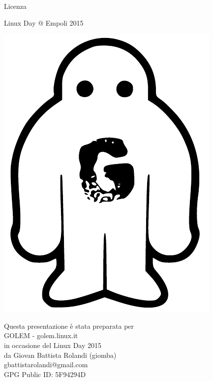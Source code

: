 \documentclass{beamer}
\begin{document}
\begin{frame}
\begin{block}{Licenza}
  \end{block}

  \begin{block}{Linux Day @ Empoli 2015}
    \centering
    \begin{minipage}{.1\linewidth}
      \includegraphics[width=.9\linewidth]{GOLEM-logo.pdf}
    \end{minipage}
    \begin{minipage}{.7\linewidth}
    \centering
    Questa presentazione è stata preparata per\\
    GOLEM - golem.linux.it\\
    in occasione del Linux Day 2015\\
    da Giovan Battista Rolandi (giomba)\\
    gbattistarolandi@gmail.com\\
    GPG Public ID: 5F94294D
    \end{minipage}
    \begin{minipage}{.1\linewidth}

\end{minipage}
\end{block}
\end{frame}
\end{document}

